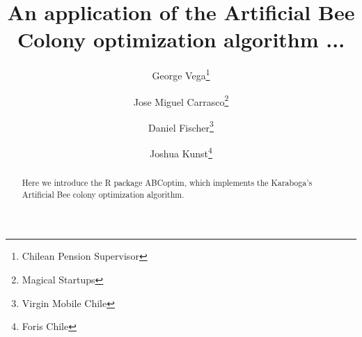 \documentclass{article}
\title{An application of the Artificial Bee Colony optimization algorithm ...}
\author{
George Vega\thanks{Chilean Pension Supervisor} \and
Jose Miguel Carrasco\thanks{Magical Startups} \and
Daniel Fischer\thanks{Virgin Mobile Chile} \and
Joshua Kunst\thanks{Foris Chile}
}
\begin{document}
\maketitle

\begin{abstract}
Here we introduce the R package ABCoptim, which implements the Karaboga's 
Artificial Bee colony optimization algorithm.
\end{abstract}


\end{document}
